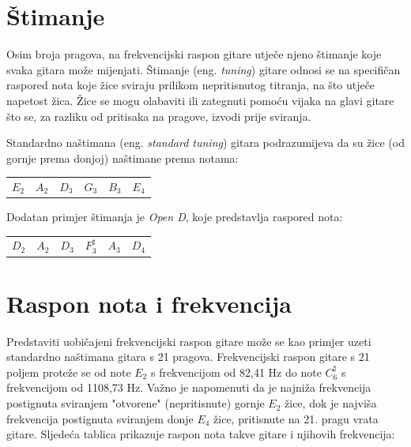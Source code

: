 \documentclass[times, utf8, diplomski, numeric]{fer}
\begin{document}
\section{Štimanje}
Osim broja pragova, na frekvencijski raspon gitare utječe njeno štimanje koje svaka gitara može mijenjati. Štimanje (eng. \textit{tuning}) gitare odnosi se na specifičan raspored nota koje žice sviraju prilikom nepritisnutog titranja, na što utječe napetost žica. Žice se mogu olabaviti ili zategnuti pomoću vijaka na glavi gitare što se, za razliku od pritisaka na pragove, izvodi prije sviranja. 

Standardno naštimana (eng. \textit{standard tuning}) gitara podrazumijeva da su žice (od gornje prema donjoj) naštimane prema notama:
\begin{center}
	\begin{tabular}{c c c c c c}
		$E_2$ & $A_2$ & $D_3$ & $G_3$ & $B_3$ & $E_4$\\
	\end{tabular}
\end{center}

Dodatan primjer štimanja je \textit{Open D}, koje predstavlja raspored nota:
\begin{center}
	\begin{tabular}{c c c c c c}
		$D_2$ & $A_2$ & $D_3$ & $F_3^\sharp$ & $A_3$ & $D_4$\\
	\end{tabular}
\end{center}

\section{Raspon nota i frekvencija}
Predstaviti uobičajeni frekvencijski raspon gitare može se kao primjer uzeti standardno naštimana gitara s 21 pragova. Frekvencijski raspon gitare s 21 poljem proteže se od note $E_2$ s frekvencijom od 82,41 Hz do note $C_6^\sharp$ s frekvencijom od 1108,73 Hz. Važno je napomenuti da je najniža frekvencija postignuta sviranjem "otvorene" (nepritisnute) gornje $E_2$ žice, dok je najviša frekvencija postignuta sviranjem donje $E_4$ žice, pritisnute na 21. pragu vrata gitare. Sljedeća tablica prikazuje raspon nota takve gitare i njihovih frekvencija:
\end{document}
